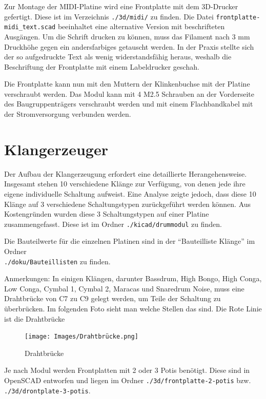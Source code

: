 Zur Montage der MIDI-Platine wird eine Frontplatte mit dem 3D-Drucker gefertigt.
Diese ist im Verzeichnis \texttt{./3d/midi/} zu finden.
Die Datei \texttt{frontplatte-midi\_text.scad} beeinhaltet eine alternative Version mit beschrifteten Ausgängen. 
Um die Schrift drucken zu können, muss das Filament nach 3 mm Druckhöhe gegen ein andersfarbiges getauscht werden. 
In der Praxis stellte sich der so aufgedruckte Text als wenig widerstandsfähig heraus, weshalb die Beschriftung der Frontplatte mit einem Labeldrucker geschah.

Die Frontplatte kann nun mit den Muttern der Klinkenbuchse mit der Platine verschraubt werden. Das Modul kann mit 4 M2.5 Schrauben an der Vorderseite des Baugruppenträgers verschraubt werden und mit einem Flachbandkabel mit der Stromversorgung verbunden werden.

\section{Klangerzeuger}
Der Aufbau der Klangerzeugung erfordert eine detaillierte Herangehensweise. Insgesamt stehen 10 verschiedene Klänge zur Verfügung, von denen jede ihre eigene individuelle Schaltung aufweist. Eine Analyse zeigte jedoch, dass diese 10 Klänge auf 3 verschiedene Schaltungstypen zurückgeführt werden können. Aus Kostengründen wurden diese 3 Schaltungstypen auf einer Platine zusammengefasst. Diese ist im Ordner \texttt{./kicad/drummodul} zu finden.

Die Bauteilwerte für die einzelnen Platinen sind in der \enquote{Bauteilliste Klänge} im Ordner \\ \texttt{./doku/Bauteillisten} zu finden.

Anmerkungen: In einigen Klängen, darunter Bassdrum, High Bongo, High Conga, Low Conga, Cymbal 1, Cymbal 2, Maracas und Snaredrum Noise, muss eine Drahtbrücke von C7 zu C9  gelegt werden, um Teile der Schaltung zu überbrücken. Im folgenden Foto sieht man welche Stellen das sind. Die Rote Linie ist die Drahtbrücke

\begin{figure}[H]
    \centering
    \texttt{[image: Images/Drahtbrücke.png]}
    \caption[Drahtbrücke]{Drahtbrücke}
    \label{fig:Drahtbrücke}
\end{figure}

Je nach Modul werden Frontplatten mit 2 oder 3 Potis benötigt. Diese sind in OpenSCAD entworfen und liegen im Ordner \texttt{./3d/frontplatte-2-potis} bzw. \texttt{./3d/drontplate-3-potis}.


